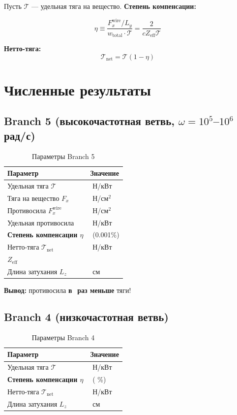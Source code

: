 \documentclass[a4paper,12pt]{article}
\begin{document}
Пусть $\mathcal{T}$ --- удельная тяга на вещество. \textbf{Степень компенсации:}

\begin{equation}
\boxed{
\eta \equiv \frac{F_x^{\text{wire}}/L_y}{w_{\text{total}} \cdot \mathcal{T}}
= \frac{2}{c Z_{\text{eff}} \mathcal{T}}
}
\label{eq:eta}
\end{equation}

\textbf{Нетто-тяга:}
\begin{equation}
\mathcal{T}_{\text{net}} = \mathcal{T} (1 - \eta)
\label{eq:net_thrust}
\end{equation}

\section{Численные результаты}

\subsection{Branch 5 (высокочастотная ветвь, $\omega = 10^5$--$10^6$ рад/с)}

\begin{table}[h]
\centering
\caption{Параметры Branch 5}
\begin{tabular}{|l|l|}
\hline
\textbf{Параметр} & \textbf{Значение} \\
\hline
Удельная тяга $\mathcal{T}$ & $ $ Н/кВт \\
Тяга на вещество $F_x$ & $ $ Н/см$^2$ \\
Противосила $F_x^{\text{wire}}$ & $ $ Н/см$^2$ \\
Удельная противосила & $ $ Н/кВт \\
\textbf{Степень компенсации $\eta$} & $ $ (0.001\%) \\
Нетто-тяга $\mathcal{T}_{\text{net}}$ & $ $ Н/кВт \\
$Z_{\text{eff}}$ & $ $ \\
Длина затухания $L_z$ & $ $ см \\
\hline
\end{tabular}
\end{table}

\textbf{Вывод:} противосила \textbf{в $ $ раз меньше} тяги!

\subsection{Branch 4 (низкочастотная ветвь)}

\begin{table}[h]
\centering
\caption{Параметры Branch 4}
\begin{tabular}{|l|l|}
\hline
\textbf{Параметр} & \textbf{Значение} \\
\hline
Удельная тяга $\mathcal{T}$ & $ $ Н/кВт \\
\textbf{Степень компенсации $\eta$} & $\mathbf{ }$ ( \%) \\
Нетто-тяга $\mathcal{T}_{\text{net}}$ & $ $ Н/кВт \\
Длина затухания $L_z$ & $ $ см \\
\hline
\end{tabular}
\end{table}
\end{document}
